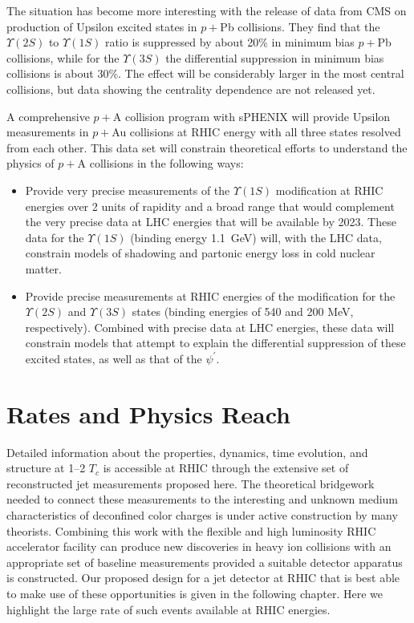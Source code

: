 The situation has become more interesting with the release of data from CMS on production of 
Upsilon excited states in $p+$Pb collisions. They find that the $\Upsilon(2S)$ to $\Upsilon(1S)$ ratio
is suppressed by about 20\% in minimum bias $p+$Pb collisions, while for the $\Upsilon(3S)$ the differential
suppression in minimum bias  collisions is about 30\%. The effect will be considerably 
larger in the most central collisions, but data showing the 
centrality dependence are not released yet.

A comprehensive $p+$A collision program with sPHENIX will provide Upsilon measurements in $p+$Au
collisions at RHIC energy with all three states resolved from each other. This data set will 
constrain theoretical efforts to understand the physics of $p+$A collisions in the following ways:

\begin{itemize}
\item Provide very precise measurements of the $\Upsilon(1S)$ modification at RHIC energies over 2 units
of rapidity and a broad \pt range that would complement the very precise data at LHC energies that will be 
available by 2023. 
These data for the $\Upsilon(1S)$ (binding energy 1.1~GeV) will, with the LHC data, constrain models of 
shadowing and partonic energy loss in cold nuclear matter.
\item Provide precise measurements at RHIC energies of the modification for the $\Upsilon(2S)$ and 
$\Upsilon(3S)$ states (binding 
energies of 540 and 200 MeV, respectively). Combined with precise data at LHC energies, these data 
will constrain models that 
attempt to explain the differential suppression of these excited states, as well as that of the $\psi^\prime$. 
\end{itemize}



\section{Rates and Physics Reach}
\label{sec:physicscasesummary}

Detailed information about the \qgp properties,
dynamics, time evolution, and structure at 1--2 $T_{c}$ is accessible 
at RHIC through the extensive set of reconstructed jet measurements
proposed here. The theoretical bridgework needed to connect these
measurements to the interesting and unknown medium characteristics 
of deconfined color charges is under active construction by many 
theorists. Combining this work with the flexible and high luminosity
RHIC accelerator facility can produce new discoveries in heavy ion 
collisions with an appropriate set of baseline measurements 
provided a suitable detector apparatus is constructed. Our proposed
design for a jet detector at RHIC that is best able to make use of these
opportunities is given in the following chapter.
Here we highlight the large rate of such events available at RHIC energies.

